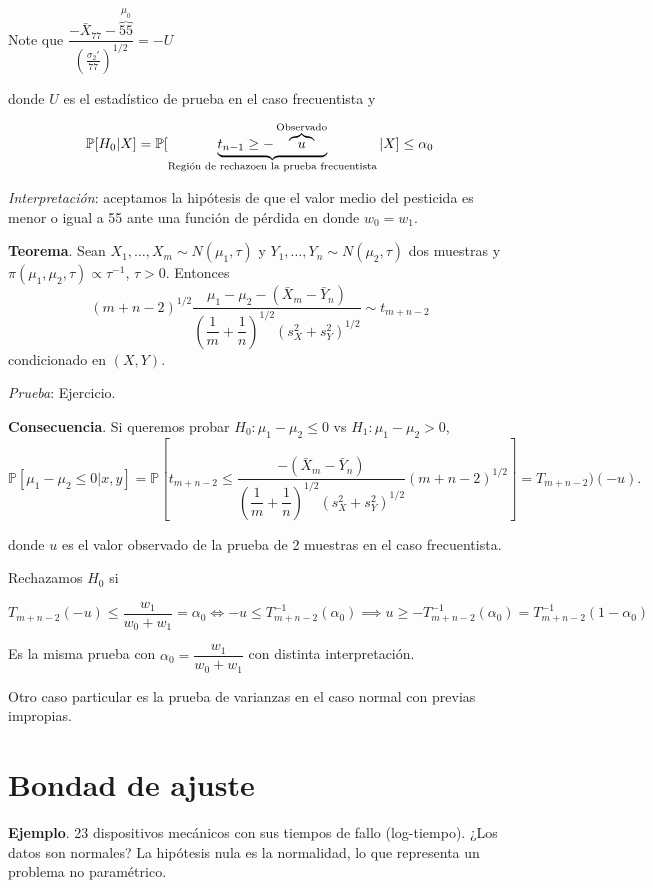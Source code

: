 \documentclass[
  12pt,
]{book}
\begin{document}
Note que \(\dfrac{-\bar X_{77}-\overbrace{55}^{\mu_0} }{\left(\frac{\sigma_2'}{77}\right)^{1/2}} = -U\)

donde \(U\) es el estadístico de prueba en el caso frecuentista y

\[\mathbb P[H_0|X] = \mathbb P[\underbrace{t_{n-1}\geq -\overbrace{u}^{\text{Observado}}}_{\text{Región de rechazo}\\\text{en la prueba frecuentista}}|X]\leq \alpha_0\]

\emph{Interpretación}: aceptamos la hipótesis de que el valor medio del pesticida es menor o igual a 55 ante una función de pérdida en donde \(w_0 = w_1\).

\textbf{Teorema}. Sean \(X_1,\dots,X_m\sim N(\mu_1,\tau)\) y \(Y_1,\dots, Y_n\sim N(\mu_2,\tau)\) dos muestras y \(\pi(\mu_1,\mu_2,\tau)\propto \tau^{-1}\), \(\tau > 0\). Entonces
\[(m+n-2)^{1/2}\dfrac{\mu_1-\mu_2-(\bar X_{m}-\bar Y_n)}{\left(\dfrac 1m + \dfrac 1n\right)^{1/2}(s_X^2+s_Y^2)^{1/2}}\sim t_{m+n-2}\]
condicionado en \((X,Y)\).

\emph{Prueba}: Ejercicio.

\textbf{Consecuencia}. Si queremos probar \(H_0: \mu_1-\mu_2\leq 0\) vs \(H_1:\mu_1-\mu_2>0\),
\[\mathbb P[\mu_1-\mu_2\leq 0|x,y] = \mathbb P\left[t_{m+n-2}\leq \dfrac{-(\bar X_m-\bar Y_n)}{\left(\dfrac 1m + \dfrac 1n\right)^{1/2}(s_X^2+s_Y^2)^{1/2}}(m+n-2)^{1/2}\right] = T_{m+n-2})(-u).\]

donde \(u\) es el valor observado de la prueba de 2 muestras en el caso frecuentista.

Rechazamos \(H_0\) si

\[ T_{m+n-2}(-u)\leq \dfrac{w_1}{w_0+w_1}=\alpha_0 \Leftrightarrow -u\leq T_{m+n-2}^{-1}(\alpha_0) \implies u\geq -T_{m+n-2}^{-1}(\alpha_0) = T_{m+n-2}^{-1}(1-\alpha_0)\]

Es la misma prueba con \(\alpha_0 = \dfrac{w_1}{w_0+w_1}\) con distinta interpretación.

Otro caso particular es la prueba de varianzas en el caso normal con previas impropias.

\hypertarget{bondad-de-ajuste}{%
\chapter{Bondad de ajuste}\label{bondad-de-ajuste}}

\textbf{Ejemplo}. 23 dispositivos mecánicos con sus tiempos de fallo (log-tiempo). ¿Los datos son normales? La hipótesis nula es la normalidad, lo que representa un problema no paramétrico.
\end{document}
